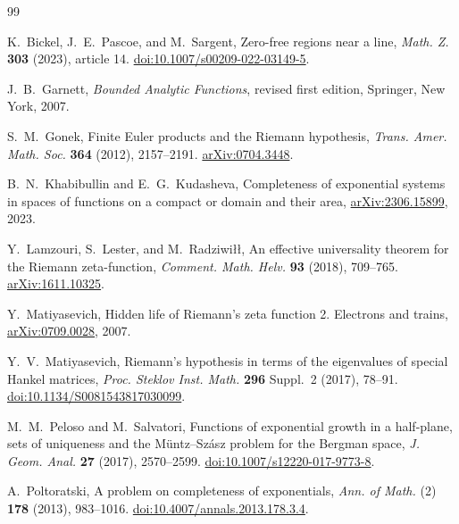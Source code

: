 \documentclass[11pt]{article}
\begin{document}
\begin{thebibliography}{99}

K.~Bickel, J.~E.~Pascoe, and M.~Sargent,
\newblock Zero-free regions near a line,
\newblock \emph{Math. Z.} \textbf{303} (2023), article 14.
\newblock \href{https://doi.org/10.1007/s00209-022-03149-5}
{doi:10.1007/s00209-022-03149-5}.

J.~B.~Garnett,
\newblock \emph{Bounded Analytic Functions},
\newblock revised first edition, Springer, New York, 2007.

S.~M.~Gonek,
\newblock Finite Euler products and the Riemann hypothesis,
\newblock \emph{Trans. Amer. Math. Soc.} \textbf{364} (2012), 2157--2191.
\newblock \href{https://arxiv.org/abs/0704.3448}{arXiv:0704.3448}.

B.~N.~Khabibullin and E.~G.~Kudasheva,
\newblock Completeness of exponential systems in spaces of functions on a
compact or domain and their area,
\newblock \href{https://arxiv.org/abs/2306.15899}{arXiv:2306.15899}, 2023.

Y.~Lamzouri, S.~Lester, and M.~Radziwi{\l}{\l},
\newblock An effective universality theorem for the Riemann zeta-function,
\newblock \emph{Comment. Math. Helv.} \textbf{93} (2018), 709--765.
\newblock \href{https://arxiv.org/abs/1611.10325}{arXiv:1611.10325}.

Y.~Matiyasevich,
\newblock Hidden life of Riemann's zeta function 2. Electrons and trains,
\newblock \href{https://arxiv.org/abs/0709.0028}{arXiv:0709.0028}, 2007.

Y.~V.~Matiyasevich,
\newblock Riemann's hypothesis in terms of the eigenvalues of special Hankel
matrices,
\newblock \emph{Proc. Steklov Inst. Math.} \textbf{296} Suppl.~2 (2017),
78--91.
\newblock \href{https://doi.org/10.1134/S0081543817030099}
{doi:10.1134/S0081543817030099}.

M.~M.~Peloso and M.~Salvatori,
\newblock Functions of exponential growth in a half-plane, sets of uniqueness
and the M\"untz--Sz\'asz problem for the Bergman space,
\newblock \emph{J. Geom. Anal.} \textbf{27} (2017), 2570--2599.
\newblock \href{https://doi.org/10.1007/s12220-017-9773-8}
{doi:10.1007/s12220-017-9773-8}.

A.~Poltoratski,
\newblock A problem on completeness of exponentials,
\newblock \emph{Ann. of Math.} (2) \textbf{178} (2013), 983--1016.
\newblock \href{https://doi.org/10.4007/annals.2013.178.3.4}
{doi:10.4007/annals.2013.178.3.4}.


\end{thebibliography}
\end{document}
